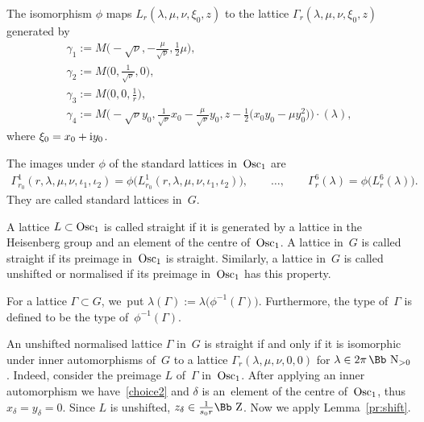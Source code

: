 \documentclass[10pt,a4paper]{amsart}
\newcommand\NN{{\mbox{\Bb N}}}
\newcommand\ZZ{{\mbox{\Bb Z}}}
\newcommand{\Osc}{{\rm Osc}}
\numberwithin{equation}{section}
\begin{document}
The isomorphism $\phi$ maps $L_r(\lambda,\mu,\nu,\xi_0,z)$ to the lattice $\Gamma_r(\lambda,\mu,\nu,\xi_0,z)$ generated by
\begin{gather}
\gamma_1:= M\bigg({-}\sqrt\nu,-\frac{\mu}{\sqrt\nu},\frac{1}{2}\mu\bigg), \label{g1}
\\
\gamma_2:= M\bigg(0,\frac{1}{\sqrt\nu},0\bigg), \label{g2}
\\
\gamma_3:= M\bigg(0,0,\frac{1}{r}\bigg), \label{g3}
\\
\gamma_4:= M\bigg({-}\sqrt\nu y_0,\frac{1}{\sqrt\nu} x_0-\frac{\mu}{\sqrt\nu} y_0,z-\frac{1}{2}\big(x_0 y_0-\mu y_0^2\big)\bigg)\cdot(\lambda), \label{g4}
\end{gather}
where $\xi_0=x_0+{\rm i}y_0$.

The images under $\phi$ of the standard lattices in~$\Osc_1$ are
\begin{gather*}
\Gamma^1_{r_0}(r,\lambda,\mu,\nu,\iota_1,\iota_2) = \phi\big(L^1_{r_0}(r,\lambda,\mu,\nu,\iota_1,\iota_2)\big),\qquad\dots,\qquad
\Gamma^6_r(\lambda)=\phi\big(L^6_r(\lambda)\big).
\end{gather*}
They are called standard lattices in~$G$.

\begin{Definition} A lattice $L\subset \Osc_1$ is called straight if it is generated by a lattice in the Heisenberg group and an element of the centre of~$\Osc_1$. A lattice in~$G$ is called straight if its preimage in~$\Osc_1$ is straight. Similarly, a lattice in~$G$ is called unshifted or normalised if its preimage in~$\Osc_1$ has this property.
\end{Definition}
\begin{Definition} For a lattice $\Gamma\subset G$, we~put $\lambda(\Gamma):=\lambda\big(\phi^{-1}(\Gamma)\big)$. Furthermore, the type of~$\Gamma$ is defined to be the type of~$\phi^{-1}(\Gamma)$.
\end{Definition}
\begin{Remark}
An unshifted normalised lattice $\Gamma$ in~$G$ is straight if and only if it is isomorphic under inner automorphisms of~$G$ to a lattice $\Gamma_r(\lambda,\mu,\nu,0,0)$ for $\lambda\in2\pi\,\NN_{>0}$. Indeed, consider the preimage $L$ of~$\Gamma$ in~$\Osc_1$. After applying an inner automorphism we have~\eqref{choice2} and $\delta$ is an~element of the centre of~$\Osc_1$, thus $x_\delta=y_\delta=0$. Since $L$ is unshifted, $z_\delta\in\frac 1{s_0r}\ZZ$. Now we apply Lemma~\ref{pr:shift}.
\end{Remark}
\end{document}
